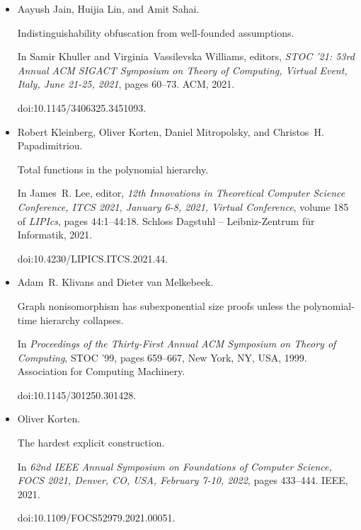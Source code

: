 \documentclass[10pt,a4paper]{article}
\begin{document}
\begin{itemize}
\item[] 
[17]

Aayush Jain, Huijia Lin, and Amit Sahai.


Indistinguishability obfuscation from well-founded assumptions.


In Samir Khuller and Virginia Vassilevska Williams, editors, \emph{STOC ’21: 53rd Annual ACM SIGACT Symposium on Theory of Computing,
Virtual Event, Italy, June 21-25, 2021}, pages 60–73. ACM, 2021.


doi:10.1145/3406325.3451093.





\item[] 
[18]

Robert Kleinberg, Oliver Korten, Daniel Mitropolsky, and Christos H.
Papadimitriou.


Total functions in the polynomial hierarchy.


In James R. Lee, editor, \emph{12th Innovations in Theoretical
Computer Science Conference, ITCS 2021, January 6-8, 2021, Virtual
Conference}, volume 185 of \emph{LIPIcs}, pages 44:1–44:18. Schloss Dagstuhl
– Leibniz-Zentrum für Informatik, 2021.


doi:10.4230/LIPICS.ITCS.2021.44.





\item[] 
[19]

Adam R. Klivans and Dieter van Melkebeek.


Graph nonisomorphism has subexponential size proofs unless the
polynomial-time hierarchy collapses.


In \emph{Proceedings of the Thirty-First Annual ACM Symposium on
Theory of Computing}, STOC ’99, pages 659–667, New York, NY, USA, 1999.
Association for Computing Machinery.


doi:10.1145/301250.301428.





\item[] 
[20]

Oliver Korten.


The hardest explicit construction.


In \emph{62nd IEEE Annual Symposium on Foundations of Computer
Science, FOCS 2021, Denver, CO, USA, February 7-10, 2022}, pages 433–444.
IEEE, 2021.


doi:10.1109/FOCS52979.2021.00051.






\end{itemize}
\end{document}
